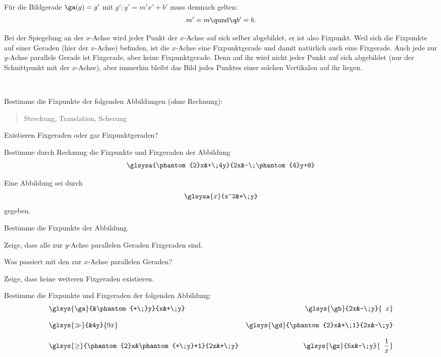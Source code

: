 \documentclass[%
11pt,%
twoside,%
titlepage,%
german,%
headsepline%
]{scrartcl}
\begin{document}
Für die Bildgerade $\ga(g)=g'$ mit $g' : y' = m'x' + b'$ muss demnach gelten:
$$m'=m\q\text{und}\q b'=b.$$

\begin{bsp}
Bei der Spiegelung an der $x$-Achse wird jeder Punkt der $x$-Achse auf sich selber abgebildet, er ist also Fixpunkt. Weil sich die Fixpunkte auf einer Geraden (hier der $x$-Achse) befinden, ist die $x$-Achse eine Fixpunktgerade und damit natürlich auch eine Fixgerade. Auch jede zur $y$-Achse parallele Gerade ist Fixgerade, aber keine Fixpunktgerade. Denn auf ihr wird nicht jeder Punkt auf sich abgebildet (nur der Schnittpunkt mit der $x$-Achse), aber immerhin bleibt das Bild jedes Punktes einer solchen Vertikalen auf ihr liegen.
\end{bsp}

\begin{ueb}
\ \\[-4ex]
\begin{enumeratea}
\item Bestimme die Fixpunkte der folgenden Abbildungen (ohne Rechnung):
\begin{quote}
Streckung, Translation, Scherung
\end{quote}
Existieren Fixgeraden oder gar Fixpunktgeraden?
\item Bestimme durch Rechnung die Fixpunkte und Fixgeraden der Abbildung
$$\glsysa{\phantom{2}x&+\;4y}{2x&-\;\phantom{4}y+8}$$
\item Eine Abbildung sei durch
$$\glsysa{x}{x^2&+\;y}$$
gegeben.
\begin{enumeratei}
\item Bestimme die Fixpunkte der Abbildung.
\item Zeige, dass alle zur $y$-Achse parallelen Geraden Fixgeraden sind.
\item Was passiert mit den zur $x$-Achse parallelen Geraden?
\item Zeige, dass keine weiteren Fixgeraden existieren.
\end{enumeratei}
\end{enumeratea}
\end{ueb}

\begin{ueb}
Bestimme die Fixpunkte und Fixgeraden der folgenden Abbildung:
\begin{align*}
&\glsys{\ga}{&\phantom{+\;}y}{x&+\;y}&\glsys{\gb}{2x&-\;y}{\phantom{2}x}\\[2ex]
&\glsys{\gg}{&4y}{9x}&\glsys{\gd}{\phantom{2}x&+\;1}{2x&-\;y}\\[2ex]
&\glsys{\ge}{\phantom{2}x&\phantom{+\;y}+1}{2x&+\;y}&\glsys{\gz}{5x&-\;y}{\phantom{5}\frac{1}{x}}
\end{align*}
\end{ueb}
\end{document}
